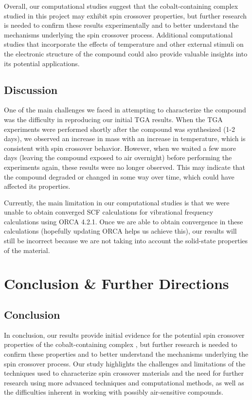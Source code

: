 \documentclass[journal=jacsat,manuscript=communication]{achemso}
\newcommand*\compound{\ch{Co(phen)2(NCS)2} }
\begin{document}
Overall, our computational studies suggest that the cobalt-containing complex studied in this project may exhibit spin crossover properties, but further research is needed to confirm these results experimentally and to better understand the mechanisms underlying the spin crossover process. Additional computational studies that incorporate the effects of temperature and other external stimuli on the electronic structure of the compound could also provide valuable insights into its potential applications.
\subsection{Discussion}


One of the main challenges we faced in attempting to characterize the compound was the difficulty in reproducing our initial TGA results. When the TGA experiments were performed shortly after the compound was synthesized (1-2 days), we observed an increase in mass with an increase in temperature, which is consistent with spin crossover behavior. However, when we waited a few more days (leaving the compound exposed to air overnight) before performing the experiments again, these results were no longer observed. This may indicate that the compound degraded or changed in some way over time, which could have affected its properties. 

Currently, the main limitation in our computational studies is that we were unable to obtain converged SCF calculations for vibrational frequency calculations using ORCA 4.2.1. Once we are able to obtain convergence in these calculations (hopefully updating ORCA helps us achieve this), our results will still be incorrect because we are not taking into account the solid-state properties of the material. 





\section{Conclusion \& Further Directions}
\subsection{Conclusion}
In conclusion, our results provide initial evidence for the potential spin crossover properties of the cobalt-containing complex \compound, but further research is needed to confirm these properties and to better understand the mechanisms underlying the spin crossover process. Our study highlights the challenges and limitations of the techniques used to characterize spin crossover materials and the need for further research using more advanced techniques and computational methods, as well as the difficulties inherent in working with possibly air-sensitive compounds.
\end{document}
